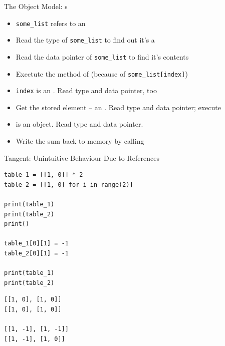 \begin{frame}{The Object Model: s}
%
\begin{center}
\end{center}
%
\begin{itemize}
\item \texttt{some\_list} refers to an 
\item Read the type of \texttt{some\_list} to find out it's a 
\item Read the data pointer of \texttt{some\_list} to find it's contents
\item Exectute the  method of  (because of \texttt{some\_list[index]})
\item \texttt{index} is an . Read type and data pointer, too
\item Get the stored element -- an . Read type and data pointer; execute 
\item {} is an object. Read type and data pointer.
\item Write the sum back to memory by calling 
\end{itemize}
%
\end{frame}


\begin{frame}[fragile]{Tangent: Unintuitive Behaviour Due to References}
%
\begin{tcbraster}[raster columns=2,
                  raster equal height,
                  nobeforeafter,
                  raster column skip=0.2cm]
%
\begin{codebox}[References.py]
\begin{verbatim}
table_1 = [[1, 0]] * 2
table_2 = [[1, 0] for i in range(2)]

print(table_1)
print(table_2)
print()

table_1[0][1] = -1
table_2[0][1] = -1

print(table_1)
print(table_2)
\end{verbatim}
\end{codebox}
%
\begin{cmdbox}
\begin{verbatim}
[[1, 0], [1, 0]]
[[1, 0], [1, 0]]

[[1, -1], [1, -1]]
[[1, -1], [1, 0]]
\end{verbatim}
\end{cmdbox}
%
\end{tcbraster}
%
\end{frame}


